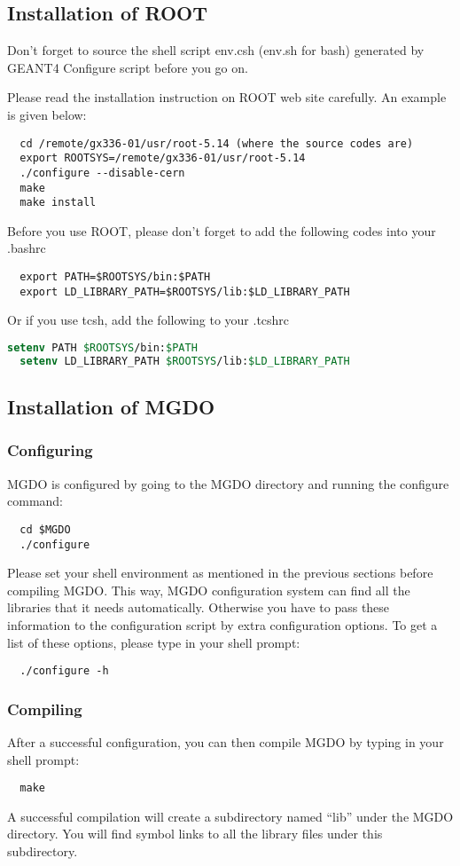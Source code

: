 \subsection{Installation of ROOT}
Don't forget to source the shell script env.csh (env.sh for bash)
generated by GEANT4 Configure script before you go on.

Please read the installation instruction on ROOT web site
carefully. An example is given below:
\begin{lstlisting}
  cd /remote/gx336-01/usr/root-5.14 (where the source codes are)
  export ROOTSYS=/remote/gx336-01/usr/root-5.14
  ./configure --disable-cern
  make
  make install
\end{lstlisting}
Before you use ROOT, please don't forget to add the following codes
into your .bashrc
\begin{lstlisting}
  export PATH=$ROOTSYS/bin:$PATH
  export LD_LIBRARY_PATH=$ROOTSYS/lib:$LD_LIBRARY_PATH
\end{lstlisting}
Or if you use tcsh, add the following to your .tcshrc
\begin{lstlisting}[language=csh]
  setenv PATH $ROOTSYS/bin:$PATH
  setenv LD_LIBRARY_PATH $ROOTSYS/lib:$LD_LIBRARY_PATH
\end{lstlisting}

\subsection{Installation of MGDO}
\subsubsection{Configuring}
MGDO is configured by going to the MGDO directory and running the configure command:
\begin{lstlisting}
  cd $MGDO
  ./configure
\end{lstlisting}
Please set your shell environment as mentioned in the previous
sections before compiling MGDO. This way, MGDO configuration system
can find all the libraries that it needs automatically. Otherwise you
have to pass these information to the configuration script by extra
configuration options. To get a list of these options, please type in
your shell prompt:
\begin{lstlisting}
  ./configure -h
\end{lstlisting}

\subsubsection{Compiling}
After a successful configuration, you can then compile MGDO by typing
in your shell prompt:
\begin{lstlisting}
  make
\end{lstlisting}
A successful compilation will create a subdirectory named ``lib''
under the MGDO directory. You will find symbol links to all the
library files under this subdirectory.


